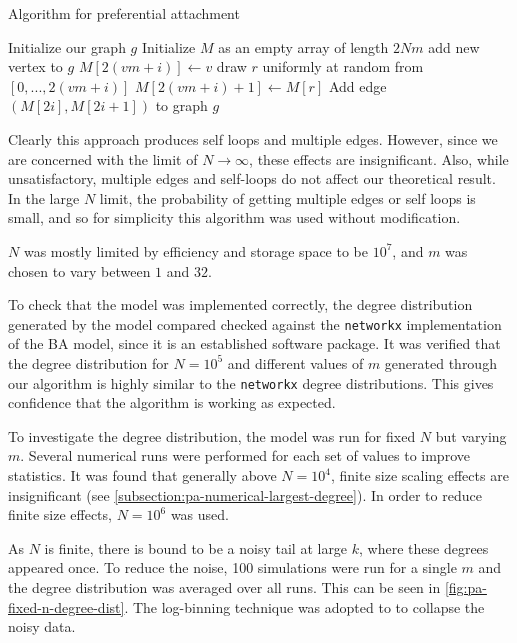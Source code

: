 \begin{algorithm}
\caption{Algorithm for preferential attachment}\label{alg:pa}
\begin{algorithmic}[1]
\State Initialize our graph $g$
\State Initialize $M$ as an empty array of length $2Nm$
	\State add new vertex to $g$
		\State $M[2(vm + i)] \gets v$
		\State draw $r$ uniformly at random 
		\State from $[0, ..., 2(vm + i)]$
		\State $M[2(vm + i)+1] \gets M[r]$ 
	\EndFor
\EndFor
\State
{}
	\State Add edge $(M[2i], M[2i+1])$ to graph $g$
\EndFor
\end{algorithmic}
\end{algorithm}

Clearly this approach produces self loops and multiple edges. However, since we are concerned with the limit of $N \rightarrow \infty$, these effects are insignificant. Also, while unsatisfactory, multiple edges and self-loops do not affect our theoretical result. In the large $N$ limit, the probability of getting multiple edges or self loops is small, and so for simplicity this algorithm was used without modification. 

$N$ was mostly limited by efficiency and storage space to be $10^7$, and $m$ was chosen to vary between $1$ and $32$. 

To check that the model was implemented correctly, the degree distribution generated by the model compared checked against the \texttt{networkx} implementation of the BA model, since it is an established software package. It was verified that the degree distribution for $N = 10^5$ and different values of $m$ generated through our algorithm is highly similar to the \texttt{networkx} degree distributions. This gives confidence that the algorithm is working as expected. 

To investigate the degree distribution, the model was run for fixed $N$ but varying $m$. Several numerical runs were performed for each set of values to improve statistics. It was found that generally above $N=10^4$, finite size scaling effects are insignificant (see \autoref{subsection:pa-numerical-largest-degree}). In order to reduce finite size effects, $N=10^6$ was used. 

As $N$ is finite, there is bound to be a noisy tail at large $k$, where these degrees appeared once. To reduce the noise, 100 simulations were run for a single $m$ and the degree distribution was averaged over all runs. This can be seen in \autoref{fig:pa-fixed-n-degree-dist}. The log-binning technique \citep{Christensen:2005} was adopted to to collapse the noisy data. 


